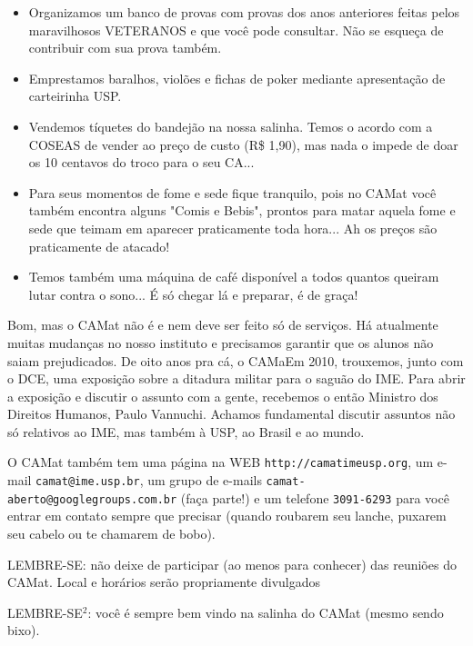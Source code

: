 \documentclass[11pt]{report}
\newenvironment{secao}[1] {
    \framebox[\textwidth] {
        \rule[-1.2ex]{5ex}{5.5ex}
        {\Large\sf #1}
        \hspace{\stretch{1}}
    } \addcontentsline{toc}{chapter}{#1}
    \nopagebreak[4]
} { 
}
\begin{document}
\begin{secao}{O CAMat}
\begin{itemize}
\item Organizamos um banco de provas com provas dos anos anteriores feitas pelos
maravilhosos VETERANOS e que você pode consultar. Não se esqueça de contribuir com sua prova também.
\item Emprestamos baralhos, violões e fichas de poker mediante apresentação de carteirinha USP.
\item Vendemos tíquetes do bandejão na nossa salinha. Temos o acordo com a COSEAS de vender ao preço de custo (R\$ 1,90), mas nada o impede de doar os 10 centavos do troco para o seu CA...
\item Para seus momentos de fome e sede fique tranquilo, pois no CAMat você também encontra alguns "Comis e Bebis", prontos para matar aquela fome e sede que teimam em aparecer praticamente toda hora... Ah os preços são praticamente de atacado!
\item Temos também uma máquina de café disponível a todos quantos queiram lutar contra o sono... É só chegar lá e preparar, é de graça!
\end{itemize}

Bom, mas o CAMat não é e nem deve ser feito só de serviços. Há atualmente muitas mudanças no nosso instituto e precisamos garantir que os alunos não saiam prejudicados. De oito anos pra cá, o CAMaEm 2010, trouxemos, junto com o DCE, uma exposição sobre a ditadura militar para o saguão do IME. Para abrir a exposição e discutir o assunto com a gente, recebemos o então Ministro dos Direitos Humanos, Paulo Vannuchi. Achamos fundamental discutir assuntos não só relativos ao IME, mas também à USP, ao Brasil e ao mundo. 
 

O CAMat também tem uma página na WEB {\tt http://camatimeusp.org}, um e-mail {\tt camat@ime.usp.br}, um grupo de e-mails {\tt camat-aberto@googlegroups.com.br} (faça parte!) e um telefone {\tt 3091-6293} para você entrar em contato sempre que precisar (quando roubarem seu lanche, puxarem seu cabelo ou te
chamarem de bobo).

LEMBRE-SE: não deixe de participar (ao menos para conhecer) das reuniões do CAMat. Local e horários serão propriamente divulgados

LEMBRE-SE$^2$: você é sempre bem vindo na salinha do CAMat (mesmo sendo bixo).

\end{secao}
\end{document}

